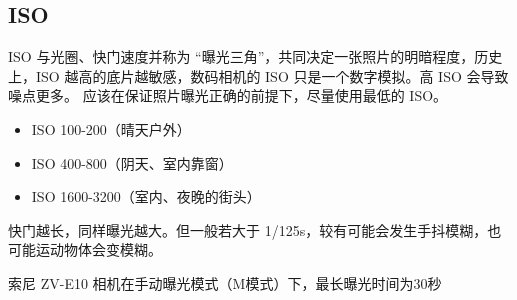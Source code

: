 \subsection{ISO}
ISO 与光圈、快门速度并称为 “曝光三角”，共同决定一张照片的明暗程度，历史上，ISO 越高的底片越敏感，数码相机的 ISO 只是一个数字模拟。高 ISO 会导致噪点更多。 应该在保证照片曝光正确的前提下，尽量使用最低的 ISO。
\begin{itemize}
\item ISO 100-200（晴天户外）
\item ISO 400-800（阴天、室内靠窗）
\item ISO 1600-3200（室内、夜晚的街头）
\end{itemize}
快门越长，同样曝光越大。但一般若大于 1/125s，较有可能会发生手抖模糊，也可能运动物体会变模糊。


索尼 ZV-E10 相机在手动曝光模式（M模式）下，最长曝光时间为30秒